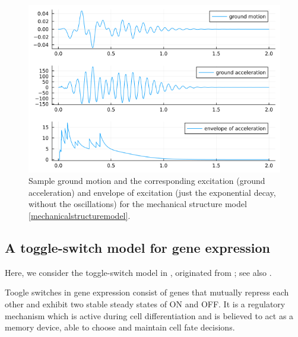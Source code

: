 \documentclass[reqno,12pt]{amsart}
\theoremstyle{plain} %
\theoremstyle{definition} %
\begin{document}
\begin{figure}[htb]
    \includegraphics[scale=0.6]{img/noise_earthquake.png}
    \caption{Sample ground motion and the corresponding excitation (ground acceleration) and envelope of excitation (just the exponential decay, without the oscillations) for the mechanical structure model \eqref{mechanicalstructuremodel}.}
    \label{figearthquakenoise}
\end{figure}

\subsection{A toggle-switch model for gene expression}

Here, we consider the toggle-switch model in \cite[Section 7.8]{Asai2016}, originated from \cite{VerdCrombachJaeger2014}; see also \cite{StrasserTheisMarr2012}.

Toogle switches in gene expression consist of genes that mutually repress each other and exhibit two stable steady states of ON and OFF. It is a regulatory mechanism which is active during cell differentiation and is believed to act as a memory device, able to choose and maintain cell fate decisions.
\end{document}
